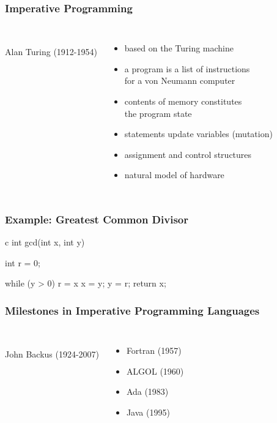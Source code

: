 \documentclass[dvipsnames]{beamer}
\theoremstyle{plain}
\begin{document}
\begin{frame}
  \frametitle{Imperative Programming}

  \begin{columns}
    \begin{center}
      \\
      Alan Turing (1912-1954)
    \end{center}

    \begin{itemize}
      \item based on the Turing machine
      \item a program is a list of instructions\\
        for a von Neumann computer
      \item contents of memory constitutes\\
        the program \alert{state}

      \pause
      \medskip
      \item statements update variables
        (\alert{mutation})
      \item assignment and control structures

      \pause
      \medskip
      \item natural model of hardware
    \end{itemize}
  \end{columns}
\end{frame}

\begin{frame}[fragile]
  \frametitle{Example: Greatest Common Divisor}

  \begin{example}
    \begin{pygments}[]{c}
int gcd(int x, int y)
{
    int r = 0;

    while (y > 0)
    {
        r = x %
        x = y;
        y = r;
    }
    return x;
}
    \end{pygments}
  \end{example}
\end{frame}

\begin{frame}
  \frametitle{Milestones in Imperative Programming Languages}

  \begin{columns}
    \begin{center}
      \\
      John Backus (1924-2007)
    \end{center}

    \begin{itemize}
      \item Fortran (1957)
      \item ALGOL (1960)
      \item Ada (1983)
      \item Java (1995)
    \end{itemize}
  \end{columns}
\end{frame}
\end{document}
